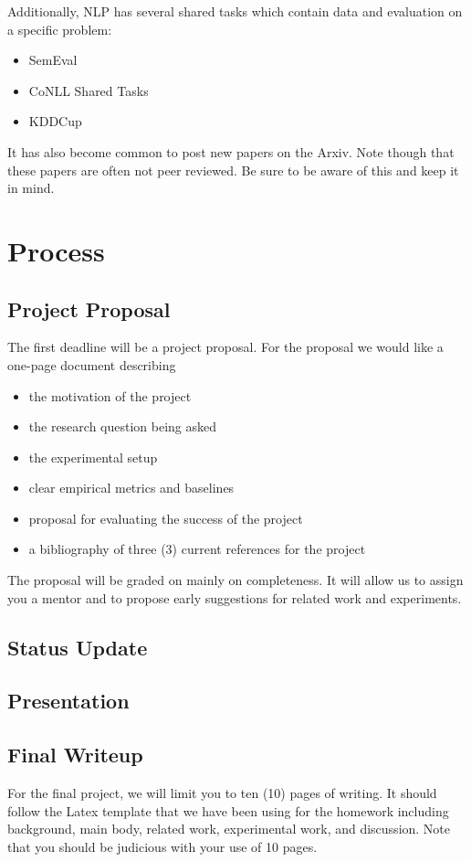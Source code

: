 \documentclass[11pt]{article}
\begin{document}
Additionally, NLP has several shared tasks which contain data and evaluation 
on a specific problem: 

\begin{itemize}
\item SemEval
\item CoNLL Shared Tasks
\item KDDCup
\end{itemize}

It has also become common to post new papers on the Arxiv. Note though that these 
papers are often not peer reviewed. Be sure to be aware of this and keep it in mind.

\section{Process}

\subsection{Project Proposal}

The first deadline will be a project proposal. 
For the proposal we would like a one-page document describing 

\begin{itemize}
\item the motivation of the project
\item the research question being asked
\item the experimental setup
\item clear empirical metrics and baselines 
\item proposal for evaluating the success of the project

\item a bibliography of three (3) current references for the project   
\end{itemize}
 

The proposal will be graded on mainly on completeness. It will allow us to assign you a mentor 
and to propose early suggestions for related work and experiments.   

\subsection{Status Update}


\subsection{Presentation}


\subsection{Final Writeup}

For the final project, we will limit you to ten (10) pages of writing.
It should follow the Latex template that we have been using for the homework 
including background, main body, related work, experimental work, and discussion. 
Note that you should be judicious with your use of 10 pages. 

\section{}
\end{document}
